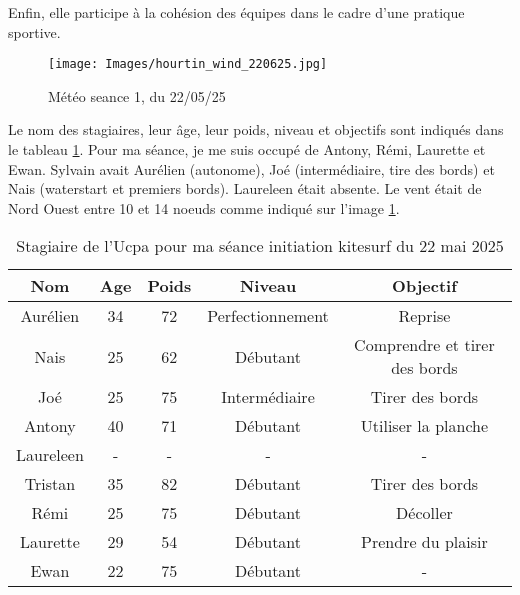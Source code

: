 \documentclass[11pt,a4paper]{report}
\begin{document}
Enfin, elle participe à la cohésion des équipes
dans le cadre d'une pratique sportive.

\begin{figure}
\centering
\texttt{[image: Images/hourtin\_wind\_220625.jpg]} 
\caption{Météo seance 1, du 22/05/25\label{meteo}}
\end{figure}


Le nom des stagiaires, leur \^age, leur poids, niveau et objectifs sont
indiqués dans le tableau \ref{stagiaires_table}.
Pour ma séance, je me suis occupé de Antony, Rémi, Laurette et Ewan.
Sylvain avait Aurélien (autonome), Joé (intermédiaire, tire des bords)
et Nais (waterstart et premiers bords).
Laureleen était absente. Le vent était de Nord Ouest entre 
10 et 14 noeuds comme indiqué sur l'image \ref{meteo}.

\begin{table}
\begin{tabular}{|c|c|c|c|c|}
        \hline
        \textbf{Nom} & \textbf{Age} & \textbf{Poids}& \textbf{Niveau}     &  \textbf{Objectif} \\ 
        \hline
        Aurélien      &  34          &  72           &   Perfectionnement  & Reprise \\
        Nais          &  25          &  62           &   Débutant          & Comprendre et tirer des bords \\
        Joé         &  25          &  75           &   Intermédiaire     & Tirer des bords \\
        Antony        &  40          &  71           &   Débutant          & Utiliser la planche  \\
        Laureleen     &  -           &  -            &   -                 &   -  \\
        Tristan       &  35          & 82            &  Débutant           & Tirer des bords  \\
        Rémi          &  25          & 75            &  Débutant           &  Décoller  \\
        Laurette      &  29          & 54            &  Débutant           & Prendre du plaisir \\
        Ewan          &  22          & 75            & Débutant            &  -  \\
        \hline
\end{tabular}
\caption{Stagiaire de l'Ucpa pour ma séance initiation kitesurf du 22 mai 2025\label{stagiaires_table}}
\end{table}
\end{document}
